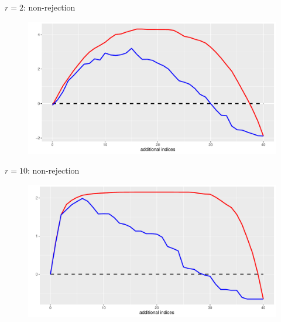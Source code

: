 \documentclass[aspectratio=169]{beamer}
\begin{document}
\begin{frame}{$r=2$: non-rejection}
\begin{figure}
\centering
\includegraphics[scale=0.6]{plot2.pdf}
\end{figure}
\end{frame}


\begin{frame}{$r=10$: non-rejection}
\begin{figure}
\centering
\includegraphics[scale=0.6]{plot10.pdf}
\end{figure}
\end{frame}

\end{document}

